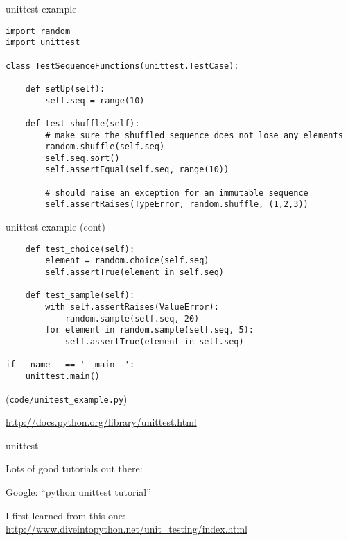 \documentclass{beamer}
\begin{document}
\begin{frame}[fragile]{unittest example}

{\small
\begin{verbatim}
import random
import unittest

class TestSequenceFunctions(unittest.TestCase):

    def setUp(self):
        self.seq = range(10)

    def test_shuffle(self):
        # make sure the shuffled sequence does not lose any elements
        random.shuffle(self.seq)
        self.seq.sort()
        self.assertEqual(self.seq, range(10))

        # should raise an exception for an immutable sequence
        self.assertRaises(TypeError, random.shuffle, (1,2,3))
\end{verbatim}
}

\end{frame} 


\begin{frame}[fragile]{unittest example (cont)}

{\small
\begin{verbatim}
    def test_choice(self):
        element = random.choice(self.seq)
        self.assertTrue(element in self.seq)

    def test_sample(self):
        with self.assertRaises(ValueError):
            random.sample(self.seq, 20)
        for element in random.sample(self.seq, 5):
            self.assertTrue(element in self.seq)

if __name__ == '__main__':
    unittest.main()
\end{verbatim}
}

\vfill
(\verb|code/unitest_example.py|)

\vfill
\url{http://docs.python.org/library/unittest.html}

\end{frame} 

\begin{frame}[fragile]{unittest}

{\Large Lots of good tutorials out there:}

\vfill
{\Large Google: ``python unittest tutorial''}

\vfill
{\Large I first learned from this one:}\\[0.1in]
\url{http://www.diveintopython.net/unit_testing/index.html}

\end{frame} 
\end{document}
